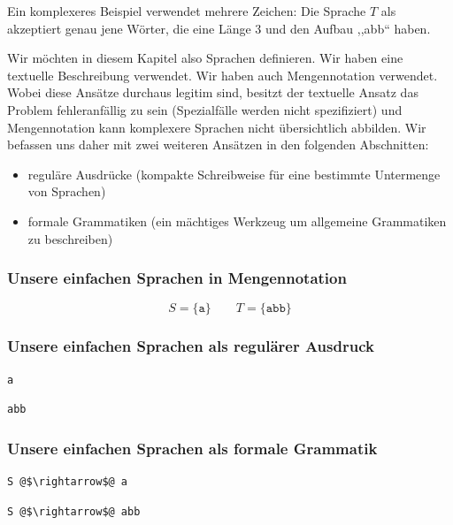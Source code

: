 Ein komplexeres Beispiel verwendet mehrere Zeichen: Die Sprache $T$ als  akzeptiert genau jene Wörter, die eine Länge 3 und den Aufbau ,,abb`` haben.

Wir möchten in diesem Kapitel also Sprachen definieren. Wir haben eine textuelle Beschreibung verwendet. Wir haben auch Mengennotation verwendet. Wobei diese Ansätze durchaus legitim sind, besitzt der textuelle Ansatz das Problem fehleranfällig zu sein (Spezialfälle werden nicht spezifiziert) und Mengennotation kann komplexere Sprachen nicht übersichtlich abbilden. Wir befassen uns daher mit zwei weiteren Ansätzen in den folgenden Abschnitten:
\begin{itemize}
  \item reguläre Ausdrücke (kompakte Schreibweise für eine bestimmte Untermenge von Sprachen)
  \item formale Grammatiken (ein mächtiges Werkzeug um allgemeine Grammatiken zu beschreiben)
\end{itemize}

\subsubsection*{Unsere einfachen Sprachen in Mengennotation}
\[
  S = \{\texttt{a}\}  \qquad  T = \{\texttt{abb}\}
\]

\subsubsection*{Unsere einfachen Sprachen als regulärer Ausdruck}
\begin{lstlisting}
a
\end{lstlisting}
\begin{lstlisting}
abb
\end{lstlisting}

\subsubsection*{Unsere einfachen Sprachen als formale Grammatik}
\begin{lstlisting}
S @$\rightarrow$@ a
\end{lstlisting}
\begin{lstlisting}
S @$\rightarrow$@ abb
\end{lstlisting}


